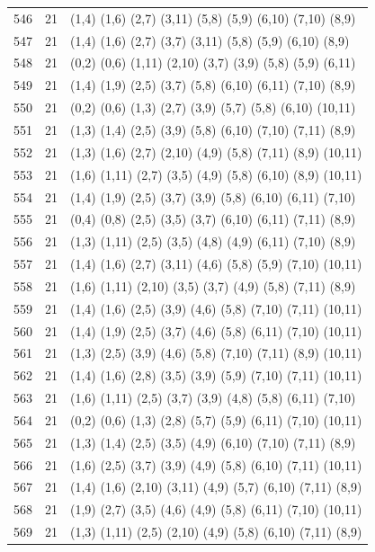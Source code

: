 {\begin{longtable}{lll}
546 & 21 & (1,4) (1,6) (2,7) (3,11) (5,8) (5,9) (6,10) (7,10) (8,9) \\
547 & 21 & (1,4) (1,6) (2,7) (3,7) (3,11) (5,8) (5,9) (6,10) (8,9) \\
548 & 21 & (0,2) (0,6) (1,11) (2,10) (3,7) (3,9) (5,8) (5,9) (6,11) \\
549 & 21 & (1,4) (1,9) (2,5) (3,7) (5,8) (6,10) (6,11) (7,10) (8,9) \\
550 & 21 & (0,2) (0,6) (1,3) (2,7) (3,9) (5,7) (5,8) (6,10) (10,11) \\
551 & 21 & (1,3) (1,4) (2,5) (3,9) (5,8) (6,10) (7,10) (7,11) (8,9) \\
552 & 21 & (1,3) (1,6) (2,7) (2,10) (4,9) (5,8) (7,11) (8,9) (10,11) \\
553 & 21 & (1,6) (1,11) (2,7) (3,5) (4,9) (5,8) (6,10) (8,9) (10,11) \\
554 & 21 & (1,4) (1,9) (2,5) (3,7) (3,9) (5,8) (6,10) (6,11) (7,10) \\
555 & 21 & (0,4) (0,8) (2,5) (3,5) (3,7) (6,10) (6,11) (7,11) (8,9) \\
556 & 21 & (1,3) (1,11) (2,5) (3,5) (4,8) (4,9) (6,11) (7,10) (8,9) \\
557 & 21 & (1,4) (1,6) (2,7) (3,11) (4,6) (5,8) (5,9) (7,10) (10,11) \\
558 & 21 & (1,6) (1,11) (2,10) (3,5) (3,7) (4,9) (5,8) (7,11) (8,9) \\
559 & 21 & (1,4) (1,6) (2,5) (3,9) (4,6) (5,8) (7,10) (7,11) (10,11) \\
560 & 21 & (1,4) (1,9) (2,5) (3,7) (4,6) (5,8) (6,11) (7,10) (10,11) \\
561 & 21 & (1,3) (2,5) (3,9) (4,6) (5,8) (7,10) (7,11) (8,9) (10,11) \\
562 & 21 & (1,4) (1,6) (2,8) (3,5) (3,9) (5,9) (7,10) (7,11) (10,11) \\
563 & 21 & (1,6) (1,11) (2,5) (3,7) (3,9) (4,8) (5,8) (6,11) (7,10) \\
564 & 21 & (0,2) (0,6) (1,3) (2,8) (5,7) (5,9) (6,11) (7,10) (10,11) \\
565 & 21 & (1,3) (1,4) (2,5) (3,5) (4,9) (6,10) (7,10) (7,11) (8,9) \\
566 & 21 & (1,6) (2,5) (3,7) (3,9) (4,9) (5,8) (6,10) (7,11) (10,11) \\
567 & 21 & (1,4) (1,6) (2,10) (3,11) (4,9) (5,7) (6,10) (7,11) (8,9) \\
568 & 21 & (1,9) (2,7) (3,5) (4,6) (4,9) (5,8) (6,11) (7,10) (10,11) \\
569 & 21 & (1,3) (1,11) (2,5) (2,10) (4,9) (5,8) (6,10) (7,11) (8,9) \\

\end{longtable}}
